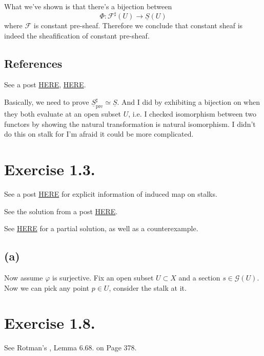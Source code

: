 What we've shown is that there's a bijection between 
\[\Phi:\mathscr F^{\sharp}(U)\to\underline{S}(U)\] where $\mathscr F$ is constant pre-sheaf. Therefore we conclude that constant sheaf is indeed the sheafification of constant pre-sheaf.

\subsection{References}

See a post \href{https://math.stackexchange.com/questions/249961/sheafification-of-the-constant-presheaf}{HERE}, \href{https://math.stackexchange.com/questions/3834390/sheafification-of-constant-presheaf}{HERE}.

Basically, we need to prove $\underline{S}_{\text{pre}}^{\sharp}\simeq \underline{S}$. And I did by exhibiting a bijection on when they both evaluate at an open subset $U$, i.e. I checked isomorphism between two functors by showing the natural transformation is natural isomorphism.
I didn't do this on stalk for I'm afraid it could be more complicated.

\section{Exercise 1.3.}

See a post \href{https://math.stackexchange.com/questions/1387214/the-induced-map-on-stalks-is-well-defined}{HERE} for explicit information of induced map on stalks. 

See the solution from a post \href{https://math.stackexchange.com/questions/4450406/surjective-morphism-of-sheaves}{HERE}.

See \href{https://www.math.arizona.edu/~cais/CourseNotes/AlgGeom04/Hartshorne_Solutions.pdf}{HERE} for a partial solution, as well as a counterexample. 
\subsection{(a)}

Now assume $\varphi$ is surjective. Fix an open subset $U\subset X$ and a section $s\in\mathscr G(U)$. Now we can pick any point $p\in U$, consider the stalk at it.


\section{Exercise 1.8.}

See Rotman's \cite{rotman2009introduction}, Lemma 6.68. on Page 378.

